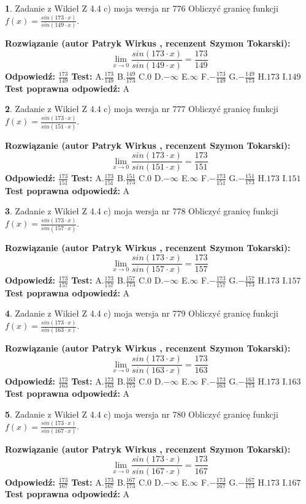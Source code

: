 \documentclass[12pt, a4paper]{article}
\theoremstyle{definition} %
\newtheorem{zad}{}
\newcommand{\zadStart}[1]{\begin{zad}#1\newline}
\newcommand{\zadStop}{\end{zad}}
\newcommand{\rozwStart}[2]{\noindent \textbf{Rozwiązanie (autor #1 , recenzent #2): }\newline}
\newcommand{\rozwStop}{\newline}
\newcommand{\odpStart}{\noindent \textbf{Odpowiedź:}\newline}
\newcommand{\odpStop}{\newline}
\newcommand{\testStart}{\noindent \textbf{Test:}\newline}
\newcommand{\testStop}{\newline}
\newcommand{\kluczStart}{\noindent \textbf{Test poprawna odpowiedź:}\newline}
\newcommand{\kluczStop}{\newline}
\begin{document}
\zadStart{Zadanie z Wikieł Z 4.4 c) moja wersja nr 776}
Obliczyć granicę funkcji $f(x)=\frac{sin(173\cdot x)}{sin(149\cdot x)}$.
\zadStop
\rozwStart{Patryk Wirkus}{Szymon Tokarski}
$$\lim\limits_{x\to 0}\frac{sin(173\cdot x)}{sin(149\cdot x)}=
\frac{173}{149}$$
\rozwStop
\odpStart
$\frac{173}{149}$
\odpStop
\testStart
A.$\frac{173}{149}$
B.$\frac{149}{173}$
C.$0$
D.$-\infty$
E.$\infty$
F.$-\frac{173}{149}$
G.$-\frac{149}{173}$
H.$173$
I.$149$
\testStop
\kluczStart
A
\kluczStop



\zadStart{Zadanie z Wikieł Z 4.4 c) moja wersja nr 777}
Obliczyć granicę funkcji $f(x)=\frac{sin(173\cdot x)}{sin(151\cdot x)}$.
\zadStop
\rozwStart{Patryk Wirkus}{Szymon Tokarski}
$$\lim\limits_{x\to 0}\frac{sin(173\cdot x)}{sin(151\cdot x)}=
\frac{173}{151}$$
\rozwStop
\odpStart
$\frac{173}{151}$
\odpStop
\testStart
A.$\frac{173}{151}$
B.$\frac{151}{173}$
C.$0$
D.$-\infty$
E.$\infty$
F.$-\frac{173}{151}$
G.$-\frac{151}{173}$
H.$173$
I.$151$
\testStop
\kluczStart
A
\kluczStop



\zadStart{Zadanie z Wikieł Z 4.4 c) moja wersja nr 778}
Obliczyć granicę funkcji $f(x)=\frac{sin(173\cdot x)}{sin(157\cdot x)}$.
\zadStop
\rozwStart{Patryk Wirkus}{Szymon Tokarski}
$$\lim\limits_{x\to 0}\frac{sin(173\cdot x)}{sin(157\cdot x)}=
\frac{173}{157}$$
\rozwStop
\odpStart
$\frac{173}{157}$
\odpStop
\testStart
A.$\frac{173}{157}$
B.$\frac{157}{173}$
C.$0$
D.$-\infty$
E.$\infty$
F.$-\frac{173}{157}$
G.$-\frac{157}{173}$
H.$173$
I.$157$
\testStop
\kluczStart
A
\kluczStop



\zadStart{Zadanie z Wikieł Z 4.4 c) moja wersja nr 779}
Obliczyć granicę funkcji $f(x)=\frac{sin(173\cdot x)}{sin(163\cdot x)}$.
\zadStop
\rozwStart{Patryk Wirkus}{Szymon Tokarski}
$$\lim\limits_{x\to 0}\frac{sin(173\cdot x)}{sin(163\cdot x)}=
\frac{173}{163}$$
\rozwStop
\odpStart
$\frac{173}{163}$
\odpStop
\testStart
A.$\frac{173}{163}$
B.$\frac{163}{173}$
C.$0$
D.$-\infty$
E.$\infty$
F.$-\frac{173}{163}$
G.$-\frac{163}{173}$
H.$173$
I.$163$
\testStop
\kluczStart
A
\kluczStop



\zadStart{Zadanie z Wikieł Z 4.4 c) moja wersja nr 780}
Obliczyć granicę funkcji $f(x)=\frac{sin(173\cdot x)}{sin(167\cdot x)}$.
\zadStop
\rozwStart{Patryk Wirkus}{Szymon Tokarski}
$$\lim\limits_{x\to 0}\frac{sin(173\cdot x)}{sin(167\cdot x)}=
\frac{173}{167}$$
\rozwStop
\odpStart
$\frac{173}{167}$
\odpStop
\testStart
A.$\frac{173}{167}$
B.$\frac{167}{173}$
C.$0$
D.$-\infty$
E.$\infty$
F.$-\frac{173}{167}$
G.$-\frac{167}{173}$
H.$173$
I.$167$
\testStop
\kluczStart
A
\kluczStop
\end{document}
